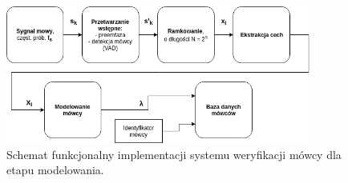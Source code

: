 \begin{figure}[ht!]
  \centering
    \includegraphics[width=0.9\textwidth]{./fundiagmodel.png}
    \caption{\label{fig:fundiagmodel} Schemat funkcjonalny implementacji systemu weryfikacji mówcy dla etapu modelowania.}
\end{figure}

